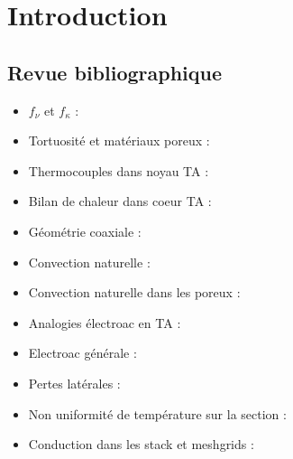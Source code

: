 \chapter{Introduction}\label{chap:Intro}%
\mylocaltoc

\section{Revue bibliographique}

\begin{itemize}
    \item $f_\nu$ et $f_\kappa$ : \cite{swift_thermoacoustics_2017,di_giulio_wire_2023}
    \item Tortuosité et matériaux poreux : \cite{johnson_theory_1987, drummond_laminar_1984}
    \item Thermocouples dans noyau TA : \cite{duffourd_refrigerateur_2001, penelet_etude_2004}
    \item Bilan de chaleur dans coeur TA : \cite{penelet_etude_2004}
    \item Géométrie coaxiale : \cite{poignand_analysis_2013, poignand_thermoacoustic_2011, tijani_study_2008, ramadan_design_2021}
    \item Convection naturelle : \cite{ross_influence_2003, hireche_numerical_2019, pan_visualization_2012, bianchi_transferts_2004, babaei_investigation_2010, gardner_cascade_2003}
    \item Convection naturelle dans les poreux : \cite{shiina_critical_2010, kvernvold_nonlinear_1979, richard_critere_1981, horton_convection_1945}
    \item Analogies électroac en TA : \cite{wakeland_use_2000, backhaus_thermoacoustic-stirling_2000, poignand_analysis_2013}
    \item Electroac générale : \cite{rossi_electroacoustique_1986, novak_measurement_2019}
    \item Pertes latérales : \cite{guedra_etudes_2012}
    \item Non uniformité de température sur la section : \cite{penelet_etude_2004}
    \item Conduction dans les stack et meshgrids : \cite{hsu_effective_1996, li_effective_2006, g_correlations_2022}
\end{itemize}

